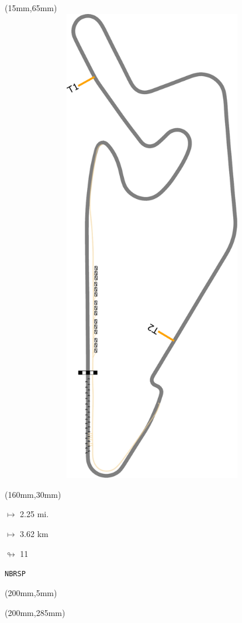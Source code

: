 \begin{textblock*}{185mm}(15mm,65mm)%
\centering
\mbox{\includegraphics[width=185mm,height=210mm,keepaspectratio]{PT/NBRSP.pdf}}
\end{textblock*}
\begin{textblock*}{40mm}(160mm,30mm)%
\Large
\par$\mapsto$ 2.25 mi.
\par$\mapsto$ 3.62 km
\par$\looparrowright$ 11
\par\hfill\tiny\tt NBRSP\\
\end{textblock*}
\begin{textblock*}{20mm}(200mm,5mm)%
\fbox{\thepage}
\label{NBRSP}
\end{textblock*}
\begin{textblock*}{20mm}(200mm,285mm)%
\fbox{\thepage}
\end{textblock*}

